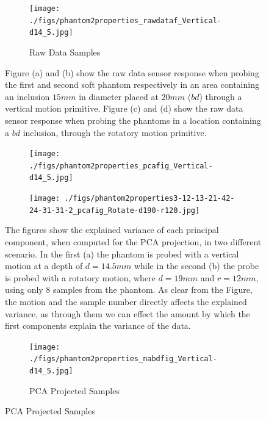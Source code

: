 \documentclass[]{interact}
\theoremstyle{plain}%
\theoremstyle{definition}
\theoremstyle{remark}
\begin{document}
\begin{minipage}{\textwidth}
	\begin{figure}[H]
		\centering
		\begin{subfigure}[b]{.9\textwidth}
			\centering
			\texttt{[image: ./figs/phantom2properties\_rawdataf\_Vertical-d14\_5.jpg]}
			\caption{Raw Data Samples}
			\label{Raw:v1}
			\vspace{8pt}
		\end{subfigure} 
		\caption{Figure (a) and (b) show the raw data sensor response when probing the first and second soft phantom respectively in an area containing an inclusion $15mm$ in diameter placed at $20mm$ ($bd$) through a vertical motion primitive. Figure (c) and (d) show the raw data sensor response when probing the phantoms in a location containing a $bd$ inclusion, through the rotatory motion primitive.
		}
		\label{Raw}
	\end{figure}
	
	\begin{figure}[H]
		\centering
		\hspace{0.03\textwidth}
		\begin{subfigure}[b]{.45\textwidth}
			\texttt{[image: ./figs/phantom2properties\_pcafig\_Vertical-d14\_5.jpg]}
			\caption{}
			\label{hist:1}
		\end{subfigure}
		\begin{subfigure}[b]{.45\textwidth}
			\texttt{[image: ./figs/phantom2properties3-12-13-21-42-24-31-31-2\_pcafig\_Rotate-d190-r120.jpg]}
			\caption{}
			\label{hist:2}
		\end{subfigure}
		\caption{The figures show the explained variance of each principal component, when computed for the PCA projection, in two different scenario. In the first (a) the phantom is probed with a vertical motion at a depth of $d=14.5mm$ while in the second (b) the probe is probed with a rotatory motion, where $d=19mm$ and $r=12mm$, using only 8 samples from the phantom. As clear from the Figure, the motion and the sample number directly affects the explained variance, as through them we can effect the amount by which the first components explain the variance of the data.}
		\label{hist}
	\end{figure}
	
	\begin{figure}[H]
		\centering
		\begin{subfigure}[b]{0.48\textwidth}
			\texttt{[image: ./figs/phantom2properties\_nabdfig\_Vertical-d14\_5.jpg]}
			\caption{PCA Projected Samples}
			\label{Raw:v2}
		\end{subfigure}
		
	\end{figure}
	\hfill\\
\end{minipage}
\end{document}
